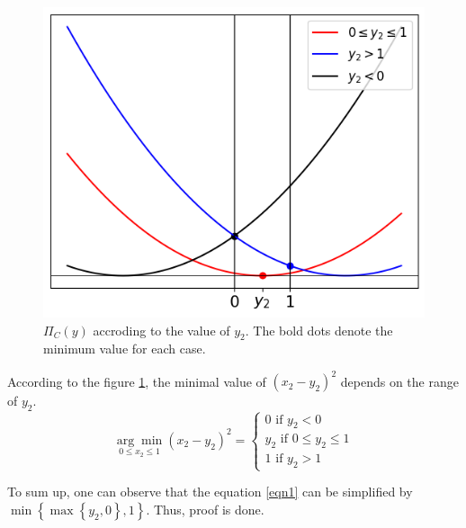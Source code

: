 \documentclass[10pt]{article}
\begin{document}
\begin{figure}[!h]
    \begin{center}
        \includegraphics[scale = 0.5]{../hw10/fig1.png}
    \end{center}
    \caption{$\Pi_C(y)$ accroding to the value of $y_2$. The bold dots denote the minimum value for each case.}
    \label{fig1}
\end{figure}

According to the figure \ref{fig1}, the minimal value of $(x_2 - y_2)^2$ depends on the range of $y_2$.
\begin{equation}
    \underset{0 \le x_2 \le 1}{\arg\min} (x_2 - y_2)^2 = \begin{cases}
        0 \text{ if } y_2 <0 \\
        y_2 \text{ if } 0 \le y_2 \le 1 \\
        1 \text{ if }y_2 >1
    \end{cases}
    \label{eqn1}
\end{equation}

To sum up, one can observe that the equation \ref{eqn1} can be simplified by $\min\left\{\max \left\{y_2, 0\right\},1\right\}$. 
Thus, proof is done. 
\end{document}
